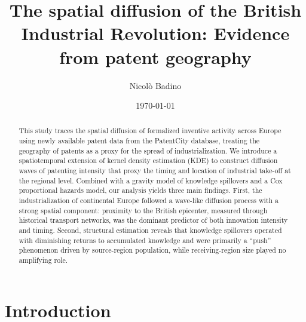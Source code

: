 \documentclass[letterpaper,12pt,leqno]{article}
\title{The spatial diffusion of the British Industrial Revolution: Evidence from patent geography}
\author[1]{Nicol\`o Badino}
\affil[1]{Department of Economics, University of Genova}
\date{\today}
\begin{document}
\maketitle
\begin{abstract}
  This study traces the spatial diffusion of formalized inventive activity across Europe using newly available patent data from the PatentCity database, treating the geography of patents as a proxy for the spread of industrialization. We introduce a spatiotemporal extension of kernel density estimation (KDE) to construct diffusion waves of patenting intensity that proxy the timing and location of industrial take-off at the regional level. Combined with a gravity model of knowledge spillovers and a Cox proportional hazards model, our analysis yields three main findings. First, the industrialization of continental Europe followed a wave-like diffusion process with a strong spatial component: proximity to the British epicenter, measured through historical transport networks, was the dominant predictor of both innovation intensity and timing. Second, structural estimation reveals that knowledge spillovers operated with diminishing returns to accumulated knowledge and were primarily a ``push'' phenomenon driven by source-region population, while receiving-region size played no amplifying role.
\end{abstract}



\section{Introduction}
\end{document}
